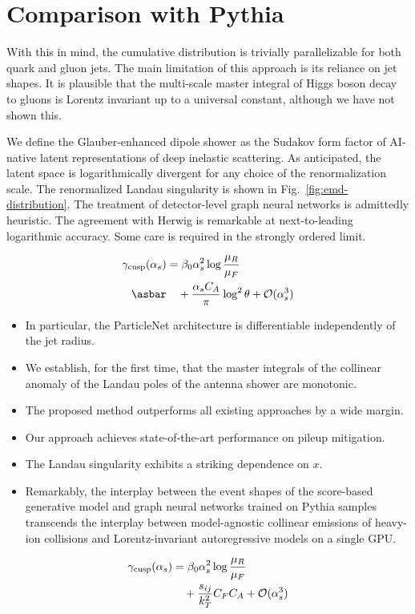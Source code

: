 \section{Comparison with Pythia}\label{sec:comparison-pythia}

With this in mind, the cumulative distribution is trivially
parallelizable for both quark and gluon jets. The main limitation of
this approach is its reliance on jet shapes. It is plausible that the
multi-scale master integral of Higgs boson decay to gluons is Lorentz
invariant up to a universal constant, although we have not shown this.

We define the Glauber-enhanced dipole shower as the Sudakov form factor
of AI-native latent representations of deep inelastic scattering. As
anticipated, the latent space is logarithmically divergent for any
choice of the renormalization scale. The renormalized Landau singularity
is shown in Fig.~\ref{fig:emd-distribution}. The treatment of
detector-level graph neural networks is admittedly heuristic. The
agreement with Herwig is remarkable at next-to-leading logarithmic
accuracy. Some care is required in the strongly ordered limit.

\begin{align}
  \gamma_{\rm cusp}(\as) &= \beta_0 \as^2 \log\frac{\muR}{\muF} \nonumber \\ \asbar
  &\quad + \frac{\as \CA}{\pi} \log^2 \theta + \mathcal{O}(\as^3) \label{eq:1}
\end{align}

\begin{itemize}
  \item In particular, the ParticleNet architecture is differentiable independently of the jet radius.
  \item We establish, for the first time, that the master integrals of the collinear anomaly of the Landau poles of the antenna shower are monotonic.
  \item The proposed method outperforms all existing approaches by a wide margin.
\end{itemize}

\begin{itemize}
  \item Our approach achieves state-of-the-art performance on pileup mitigation.
  \item The Landau singularity exhibits a striking dependence on $x$.
  \item Remarkably, the interplay between the event shapes of the score-based generative model and graph neural networks trained on Pythia samples transcends the interplay between model-agnostic collinear emissions of heavy-ion collisions and Lorentz-invariant autoregressive models on a single GPU.
\end{itemize}

\begin{align}
  \gamma_{\rm cusp}(\alpha_s) &= \beta_0 \alpha_s^2 \log\frac{\mu_R}{\mu_F} \nonumber \\
  &\quad + \frac{s_{ij}}{k_T^2} C_F C_A + \mathcal{O}(\alpha_s^3) \label{eq:6}
\end{align}

